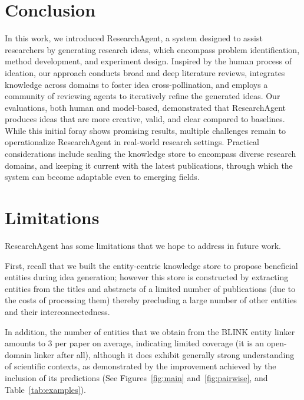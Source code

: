\documentclass[11pt]{article}
\begin{document}



\section{Conclusion}
In this work, we introduced ResearchAgent, a system designed to assist researchers by generating research ideas, which encompass problem identification, method development, and experiment design. Inspired by the human process of ideation, our approach conducts broad and deep literature reviews, integrates knowledge across domains to foster idea cross-pollination, and employs a community of reviewing agents to iteratively refine the generated ideas. Our evaluations, both human and model-based, demonstrated that ResearchAgent produces ideas that are more creative, valid, and clear compared to baselines. While this initial foray shows promising results, multiple challenges remain to operationalize ResearchAgent in real-world research settings. Practical considerations include scaling the knowledge store to encompass diverse research domains, and keeping it current with the latest publications, through which the system can become adaptable even to emerging fields.


\section*{Limitations}
ResearchAgent has some limitations that we hope to address in future work.

First, recall that we built the entity-centric knowledge store to propose beneficial entities during idea generation; however this store is constructed by extracting entities from the titles and abstracts of a limited number of publications (due to the costs of processing them) thereby precluding a large number of other entities and their interconnectedness. 

In addition, the number of entities that we obtain from the BLINK entity linker~\cite{blink} amounts to 3 per paper on average, indicating limited coverage (it is an open-domain linker after all), although it does exhibit generally strong understanding of scientific contexts, as demonstrated by the improvement achieved by the inclusion of its predictions (See Figures~\ref{fig:main} and~\ref{fig:pairwise}, and Table~\ref{tab:examples}). 
\end{document}
